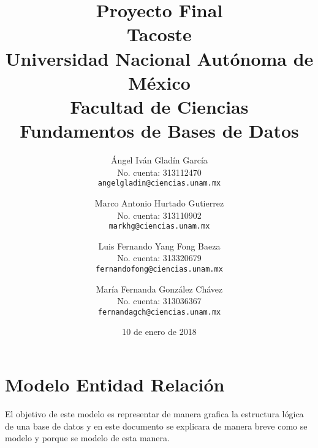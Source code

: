 \documentclass[11pt,letterpaper]{article}
\begin{document}
\title{\vspace{-1.5cm}
    Proyecto Final\\
    Tacoste\\
    \large Universidad Nacional Autónoma de México\\
    Facultad de Ciencias\\
    Fundamentos de Bases de Datos\\}
\author{
	Ángel Iván Gladín García\\
    No. cuenta: 313112470\\
    \texttt{angelgladin@ciencias.unam.mx}
    \and
    Marco Antonio Hurtado Gutierrez\\
    No. cuenta: 313110902\\
    \texttt{markhg@ciencias.unam.mx}
    \and
    Luis Fernando Yang Fong Baeza\\
    No. cuenta: 313320679\\
    \texttt{fernandofong@ciencias.unam.mx}
    \and
    María Fernanda González Chávez\\
    No. cuenta: 313036367\\
    \texttt{fernandagch@ciencias.unam.mx}
}
\date{10 de enero de 2018}
\maketitle



\section*{Modelo Entidad Relación}%

El objetivo de este modelo es representar de manera grafica la estructura lógica de una base de datos y en este documento se explicara de manera breve como se modelo y porque se modelo de esta manera.
\end{document}
